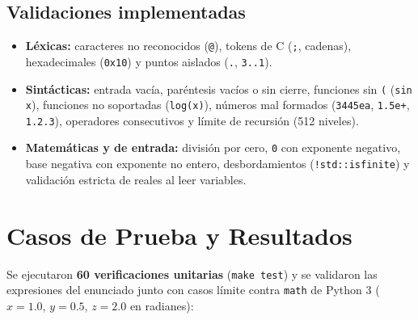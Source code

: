 \documentclass[10pt,a4paper]{article}
\begin{document}
\subsection*{Validaciones implementadas}
\begin{itemize}
    \item \textbf{Léxicas:} caracteres no reconocidos (\texttt{@}), tokens de C (\texttt{;}, cadenas), hexadecimales (\texttt{0x10}) y puntos aislados (\texttt{.}, \texttt{3..1}).
    \item \textbf{Sintácticas:} entrada vacía, paréntesis vacíos o sin cierre, funciones sin \texttt{(} (\texttt{sin x}), funciones no soportadas (\texttt{log(x)}), números mal formados (\texttt{3445ea}, \texttt{1.5e+}, \texttt{1.2.3}), operadores consecutivos y límite de recursión (512 niveles).
    \item \textbf{Matemáticas y de entrada:} división por cero, \texttt{0} con exponente negativo, base negativa con exponente no entero, desbordamientos (\texttt{!std::isfinite}) y validación estricta de reales al leer variables.
\end{itemize}

\section{Casos de Prueba y Resultados}
Se ejecutaron \textbf{60 verificaciones unitarias} (\texttt{make test}) y se validaron las expresiones del enunciado junto con casos límite contra \texttt{math} de Python 3 ($x=1.0$, $y=0.5$, $z=2.0$ en radianes):
\end{document}
